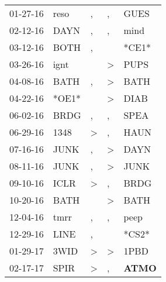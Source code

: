 \begin{supertabular}{p{0.07\textwidth}p{0.06\textwidth}p{0.02\textwidth}p{0.02\textwidth}p{0.06\textwidth}}
 01-27-16\textsuperscript{} &  reso\textsuperscript{} &                , &                , &           GUES\textsuperscript{} \\
 02-12-16\textsuperscript{} &  DAYN\textsuperscript{} &                , &                , &           mind\textsuperscript{} \\
 03-12-16\textsuperscript{} &  BOTH\textsuperscript{} &                , &                  &                            *CE1* \\
 03-26-16\textsuperscript{} &  ignt\textsuperscript{} &                  &     \textgreater &           PUPS\textsuperscript{} \\
 04-08-16\textsuperscript{} &  BATH\textsuperscript{} &                , &     \textgreater &           BATH\textsuperscript{} \\
 04-22-16\textsuperscript{} &                   *OE1* &                  &     \textgreater &           DIAB\textsuperscript{} \\
 06-02-16\textsuperscript{} &  BRDG\textsuperscript{} &                , &                , &           SPEA\textsuperscript{} \\
 06-29-16\textsuperscript{} &  1348\textsuperscript{} &     \textgreater &                , &           HAUN\textsuperscript{} \\
 07-16-16\textsuperscript{} &  JUNK\textsuperscript{} &                , &     \textgreater &           DAYN\textsuperscript{} \\
 08-11-16\textsuperscript{} &  JUNK\textsuperscript{} &                , &     \textgreater &           JUNK\textsuperscript{} \\
 09-10-16\textsuperscript{} &  ICLR\textsuperscript{} &     \textgreater &                , &           BRDG\textsuperscript{} \\
 10-20-16\textsuperscript{} &  BATH\textsuperscript{} &                  &     \textgreater &           BATH\textsuperscript{} \\
 12-04-16\textsuperscript{} &  tmrr\textsuperscript{} &                , &                , &           peep\textsuperscript{} \\
 12-29-16\textsuperscript{} &  LINE\textsuperscript{} &                , &                  &                            *CS2* \\
 01-29-17\textsuperscript{} &  3WID\textsuperscript{} &     \textgreater &     \textgreater &           1PBD\textsuperscript{} \\
 02-17-17\textsuperscript{} &  SPIR\textsuperscript{} &     \textgreater &                , &  \textbf{ATMO\textsuperscript{}} \\

\end{supertabular}
